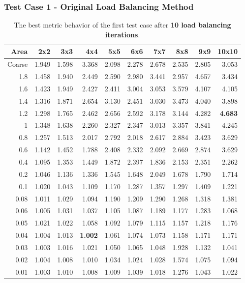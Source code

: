 \documentclass[compress]{beamer}
\begin{document}
\begin{frame}[t]\frametitle{Test Case 1 - Original Load Balancing Method}
\begin{table}[H]
\tiny
\centering
\caption{The best metric behavior of the first test case after \textbf{10 load balancing iterations}.} 
\begin{tabular}{rrrrrrrrrr}
\hline
  Area & 2x2 &3x3 & 4x4 & 5x5 & 6x6 & 7x7 &8x8 & 9x9 & 10x10 \\ 
\hline
 Coarse& 1.949 & 1.598 & 3.368 & 2.098 & 2.278 & 2.678 & 2.535 & 2.805 & 3.053 \\
 1.8 &1.458 & 1.940 & 2.449 & 2.590 & 2.980 & 3.441 & 2.957 & 4.657 & 3.434 \\
 1.6 & 1.423 & 1.949 & 2.427 & 2.411 & 3.004 & 3.053 & 3.579 & 4.107 & 4.105 \\
 1.4 & 1.316 & 1.871 & 2.654 & 3.130 & 2.451 & 3.030 & 3.473 & 4.040 & 3.898 \\
 1.2 & 1.298 & 1.765 & 2.462 & 2.656 & 2.592 & 3.178 & 3.144 & 4.282 & \textbf{\cellcolor{blue!25}4.683} \\
 1 & 1.348 & 1.638 & 2.260 & 2.327 & 2.347 & 3.013 & 3.357 & 3.841 & 4.245 \\
 0.8 & 1.257 & 1.513 & 2.017 & 2.792 & 2.018 & 2.617 & 2.884 & 3.423 & 3.629 \\
 0.6 & 1.142 & 1.452 & 1.788 & 2.408 & 2.332 & 2.092 & 2.669 & 2.874 & 3.629 \\
 0.4 & 1.095 & 1.353 & 1.449 & 1.872 & 2.397 & 1.836 & 2.153 & 2.351 & 2.262 \\
 0.2 & 1.046 & 1.136 & 1.336 & 1.545 & 1.648 & 2.049 & 1.678 & 1.790 & 1.714 \\
 0.1 & 1.020 & 1.043 & 1.109 & 1.170 & 1.287 & 1.357 & 1.297 & 1.409 & 1.221 \\
 0.08 & 1.011 & 1.029 & 1.094 & 1.190 & 1.209 & 1.290 & 1.268 & 1.318 & 1.381 \\
 0.06 & 1.005 & 1.031 & 1.037 & 1.105 & 1.087 & 1.189 & 1.177 & 1.283 & 1.068 \\
 0.05 & 1.021 & 1.022 & 1.058 & 1.092 & 1.079 & 1.115 & 1.157 & 1.218 & 1.176 \\
 0.04 & 1.004 & 1.013 & \textbf{\cellcolor{blue!25}1.002} & 1.061 & 1.074 & 1.073 & 1.158 & 1.171 & 1.171 \\
 0.03 & 1.003 & 1.016 & 1.021 & 1.050 & 1.065 & 1.048 & 1.928 & 1.132 & 1.041 \\
 0.02 & 1.004 & 1.008 & 1.010 & 1.034 & 1.024 & 1.028 & 1.574 & 1.075 & 1.094 \\
 0.01& 1.003 & 1.010 & 1.008 & 1.009 & 1.039 & 1.018 & 1.276 & 1.043 & 1.022 \\
\hline
\end{tabular}
\end{table}
\end{frame}
\end{document}
